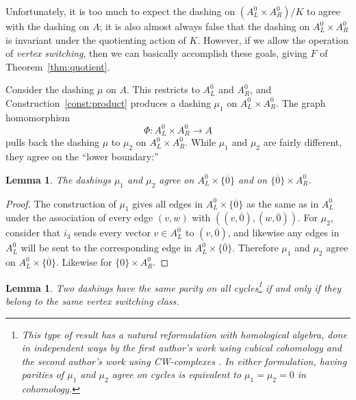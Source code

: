 \documentclass[12pt,twoside,singlespace]{article}
\numberwithin{equation}{section}
\newtheorem{lem}[equation]{Lemma}
\theoremstyle{definition}
\begin{document}
Unfortunately, it is too much to expect the dashing on $(A_L^0\times A_R^0)/K$ to agree with the dashing on $A$; it is also almost always false that the dashing on $A_L^0\times A_R^0$ is invariant under the quotienting action of $K$. However, if we allow the operation of \emph{vertex switching}, then we can basically accomplish these goals, giving $F$ of Theorem~\ref{thm:quotient}.






Consider the dashing $\mu$ on $A$.  This restricts to $A_L^0$ and $A_R^0$, and Construction~\ref{const:product} produces a dashing $\mu_1$ on $A_L^0\times A_R^0$.   The graph homomorphism
\[\Phi:A_L^0\times A_R^0\to A\]
pulls back the dashing $\mu$ to $\mu_2$ on $A_L^0\times A_R^0$. While $\mu_1$ and $\mu_2$ are fairly different, they agree on the ``lower boundary:''

\begin{lem}
\label{lem:agree-on-boundary}
The dashings $\mu_1$ and $\mu_2$ agree on $A_L^0\times \{\overline{0}\}$ and on $\{\overline{0}\}\times A_R^0$.
\end{lem}
\begin{proof}
The construction of $\mu_1$ gives all edges in $A_L^0\times\{\overline{0}\}$ as the same as in $A_L^0$ under the association of every edge $(v,w)$ with $((v,\overline{0}),(w,\overline{0}))$.  For $\mu_2$, consider that $i_3$ sends every vector $v\in A_L^0$ to $(v,\overline{0})$, and likewise any edges in $A_L^0$ will be sent to the corresponding edge in $A_L^0\times\{\overline{0}\}$.  Therefore $\mu_1$ and $\mu_2$ agree on $A_L^0\times\{\overline{0}\}$.  Likewise for $\{0\}\times A_R^0$.
\end{proof}


\begin{lem}
\label{lem:cycles-switching-class}
Two dashings have the same parity on all cycles\footnote{This type of result has a natural reformulation with homological algebra, done in independent ways by the first author's work using cubical cohomology \cite{dil:cohomology} and the second author's work using CW-complexes \cite{zhang:adinkras}. In either formulation, having parities of $\mu_1$ and $\mu_2$ agree on cycles is equivalent to $\mu_1 = \mu_2 = 0$ in cohomology.} if and only if they belong to the same vertex switching class.
\end{lem}
\end{document}
